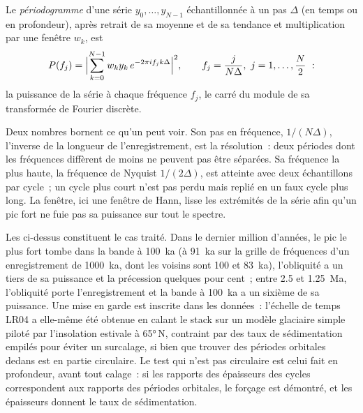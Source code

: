 \begin{definition}[Périodogramme]\label{def:b3:sequence-stratigraphy:periodogram}
Le \emph{périodogramme} d'une série $y_0, \dots, y_{N-1}$
échantillonnée à un pas $\Delta$ (en temps ou en profondeur), après retrait de sa moyenne et
de sa tendance et multiplication par une fenêtre $w_k$, est
\[
P(f_j) = \Bigl|\sum_{k=0}^{N-1} w_k y_k\, e^{-2\pi i f_j k\Delta}\Bigr|^2,
\qquad f_j = \frac{j}{N\Delta},\ j = 1, \dots, \frac N2~:
\]
la puissance de la série à chaque fréquence $f_j$, le carré du module de
sa transformée de Fourier discrète.
\end{definition}

Deux nombres bornent ce qu'un  peut voir. Son pas en fréquence, $1/(N\Delta)$,
l'inverse de la longueur de l'enregistrement, est la résolution~: deux périodes dont les
fréquences diffèrent de moins ne peuvent pas être séparées. Sa fréquence la plus haute, la
fréquence de Nyquist $1/(2\Delta)$, est atteinte avec deux échantillons par cycle~; un
cycle plus court n'est pas perdu mais replié en un faux cycle plus long. La fenêtre,
ici une fenêtre de Hann, lisse les extrémités de la série afin qu'un pic fort ne
fuie pas sa puissance sur tout le spectre.


Les  ci-dessus constituent le cas traité. Dans le dernier million d'années, le
pic le plus fort tombe dans la bande à \qty{100}{ka} (à \qty{91}{ka} sur la grille de
fréquences d'un enregistrement de \qty{1000}{ka}, dont les voisins sont 100 et \qty{83}{ka}),
l'obliquité a un tiers de sa puissance et la précession quelques pour cent~;
entre 2.5 et \qty{1.25}{Ma}, l'obliquité porte l'enregistrement et la
bande à \qty{100}{ka} a un sixième de sa puissance. Une mise en garde est inscrite dans les
données~: l'échelle de temps LR04 a elle-même été obtenue en calant le stack sur un
modèle glaciaire simple piloté par l'insolation estivale à \ang{65}\,N, contraint par des
taux de sédimentation empilés pour éviter un surcalage, si bien que trouver des périodes
orbitales dedans est en partie circulaire. Le test qui n'est pas circulaire est celui fait en
profondeur, avant tout calage~: si les rapports des épaisseurs des cycles correspondent aux
rapports des périodes orbitales, le forçage est démontré, et les épaisseurs donnent le
taux de sédimentation.

